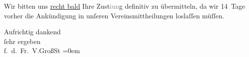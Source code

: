 \pstart
           Wir bitten uns \uline{recht bald} Ihre Zust\textcolor{gray}{i{\geminationm}un}g definitiv zu übermitteln, da wir
               14 Tage vorher die Ankündigung in unſeren Vereinsmittheilungen loslaſſen müſſen.\pend
           
\pstart
           Aufrichtig dankend{\\[\baselineskip]}ſehr ergeben{\\[\baselineskip]}f. d. Fr. V.\spacefill\mbox{GroßSt}\pend
           \leftskip=0em{}\endnumbering{}  
      